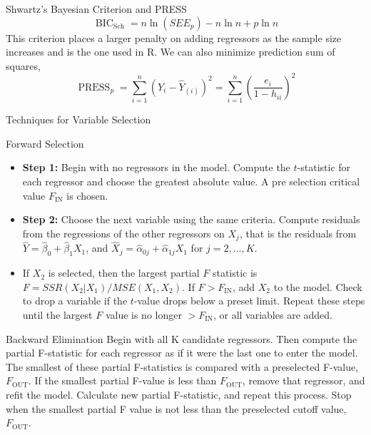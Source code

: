\documentclass{article}
\DeclareMathOperator{\bic}{BIC}
\DeclareMathOperator{\sch}{Sch}
\DeclareMathOperator{\press}{PRESS}
\DeclareMathOperator{\fin}{IN}
\DeclareMathOperator{\fout}{OUT}
\begin{document}
\begin{multicols*}{3}
\begin{blackbox}{Shwartz's Bayesian Criterion and PRESS}
            \[\bic_{\sch} = n\ln (SEE_p) - n \ln n + p \ln n\]
            This criterion places a larger penalty on adding regressors as the sample size increases and is the one used in R. We can also minimize prediction sum of squares,
            \[\press_p = \sum_{i=1}^n(Y_i - \hat{Y}_{(i)})^2 = \sum_{i=1}^n\left(\frac{e_i}{1-h_{ii}}\right)^2\]
        \end{blackbox}
        \begin{blackbox}{Techniques for Variable Selection}
            \begin{redbox}{Forward Selection}
                \begin{itemize}[leftmargin=7pt]
                    \item \textbf{Step 1:} Begin with no regressors in the model. Compute the $t$-statistic for each regressor and choose the greatest absolute value. A pre selection critical value $F_{\fin}$ is chosen. 
                    \item \textbf{Step 2:} Choose the next variable using the same criteria. Compute residuals from the regressions of the other regressors on $X_j$, that is the residuals from $\hat{Y} = \hat{\beta}_0 + \hat{\beta}_1X_1$, and $\hat{X}_j = \hat{\alpha}_{0j} + \hat{\alpha}_{1j}X_1$ for $j = 2, \ldots, K$.
                    \item If $X_2$ is selected, then the largest partial $F$ statistic is $F = SSR(X_2|X_1)/MSE(X_1,X_2)$. If $F > F_{\fin}$, add $X_2$ to the model. Check to drop a variable if the $t$-value drops below a preset limit. Repeat these steps until the largest $F$ value is no longer $> F_{\fin}$, or all variables are added.
                \end{itemize}
                \vspace{-2ex}
            \end{redbox}
            \begin{brownbox}{Backward Elimination}
                Begin with all K candidate regressors. Then compute the partial F-statistic for each regressor as if it were the last one to enter the model. The smallest of these partial F-statistics is compared with a preselected F-value, $F_{\fout}$. If the smallest partial F-value is less than $F_{\fout}$, remove that regressor, and refit the model. Calculate new partial F-statistic, and repeat this process. Stop when the smallest partial F value is not less than the preselected cutoff value, $F_{\fout}$. 
                \vspace{-1ex}
            \end{brownbox}

\end{blackbox}
\end{multicols*}
\end{document}

